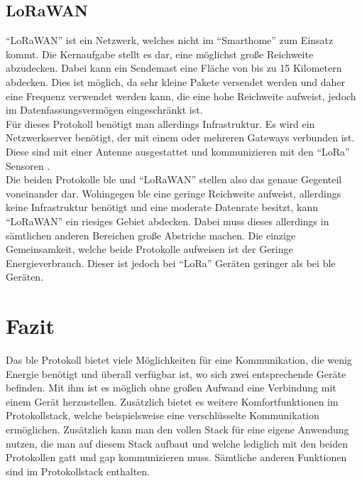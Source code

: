 \subsection{LoRaWAN}
\label{ss:vergleich:lora}

"`LoRaWAN"' ist ein Netzwerk, welches nicht im "`Smarthome"' zum Einsatz kommt. Die Kernaufgabe stellt es dar, eine möglichst große Reichweite abzudecken. Dabei kann ein Sendemast eine Fläche von bis zu 15 Kilometern abdecken. Dies ist möglich, da sehr kleine Pakete versendet werden und daher eine Frequenz verwendet werden kann, die eine hohe Reichweite aufweist, jedoch im Datenfassungsvermögen eingeschränkt ist.\\

\noindent Für dieses Protokoll benötigt man allerdings Infrastruktur. Es wird ein Netzwerkserver benötigt, der mit einem oder mehreren Gateways verbunden ist. Diese sind mit einer Antenne ausgestattet und kommunizieren mit den "`LoRa"' Sensoren \cite{LO:WWW}.\\

\noindent Die beiden Protokolle \ac{ble} und "`LoRaWAN"' stellen also das genaue Gegenteil voneinander dar. Wohingegen \ac{ble} eine geringe Reichweite aufweist, allerdings keine Infrastruktur benötigt und eine moderate Datenrate besitzt, kann "`LoRaWAN"' ein riesiges Gebiet abdecken. Dabei muss dieses allerdings in sämtlichen anderen Bereichen große Abstriche machen. Die einzige Gemeinsamkeit, welche beide Protokolle aufweisen ist der Geringe Energieverbrauch. Dieser ist jedoch bei "`LoRa"' Geräten geringer als bei \ac{ble} Geräten.\\ 

\section{Fazit}
\label{s:fazit}

Das \ac{ble} Protokoll bietet viele Möglichkeiten für eine Kommunikation, die wenig Energie benötigt und überall verfügbar ist, wo sich zwei entsprechende Geräte befinden. Mit ihm ist es möglich ohne großen Aufwand eine Verbindung mit einem Gerät herzustellen. Zusätzlich bietet es weitere Komfortfunktionen im Protokollstack, welche beispielsweise eine verschlüsselte Kommunikation ermöglichen. Zusätzlich kann man den vollen Stack für eine eigene Anwendung nutzen, die man auf diesem Stack aufbaut und welche lediglich mit den beiden Protokollen \ac{gatt} und \ac{gap} kommunizieren muss. Sämtliche anderen Funktionen sind im Protokollstack enthalten.\\

